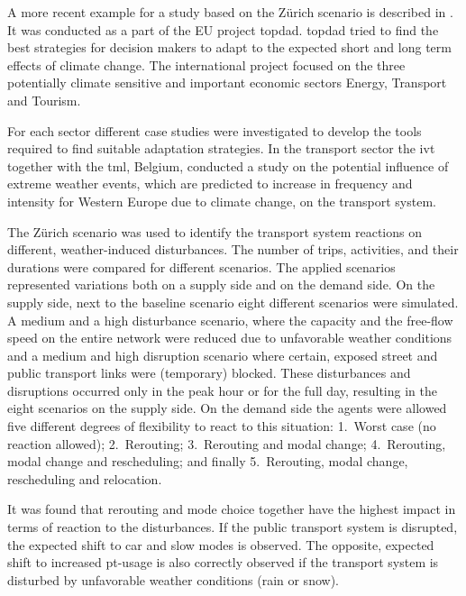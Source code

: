 A more recent example for a study based on the Zürich scenario is described in \citet[][]{HeyndrickxEtAl_unpub_TRB_2016, BoeschEtAl_TechRep_ToPDAd_2014,HeyndrickxEtAl_TechRep_IVT_2014,PilliSihvolaEtAl_EJTIR_2014,BoeschCiari_STRC_2014,Boesch_unpub_MATSim_2014}. It was conducted as a part of the EU project \gls{topdad}. \gls{topdad} tried to find the best strategies for decision makers to adapt to the expected short and long term effects of climate change. The international project focused on the three potentially climate sensitive and important economic sectors Energy, Transport and Tourism.

For each sector different case studies were investigated to develop the tools required to find suitable adaptation strategies. In the transport sector the \gls{ivt} together with the \gls{tml}, Belgium, conducted a study on the potential influence of extreme weather events, which are predicted to increase in frequency and intensity for Western Europe due to climate change, on the transport system.

The Zürich scenario was used to identify the transport system reactions on different, weather-induced disturbances. The number of trips, activities, and their durations were compared for different scenarios. The applied scenarios represented variations both on a supply side and on the demand side. On the supply side, next to the baseline scenario eight different scenarios were simulated. A medium and a high disturbance scenario, where the capacity and the free-flow speed on the entire network were reduced due to unfavorable weather conditions and a medium and high disruption scenario where certain, exposed street and public transport links were (temporary) blocked. These disturbances and disruptions occurred only in the peak hour or for the full day, resulting in the eight scenarios on the supply side. On the demand side the agents were allowed five different degrees of flexibility to react to this situation: 1.~Worst case (no reaction allowed); 2.~Rerouting; 3.~Rerouting and modal change; 4.~Rerouting, modal change and rescheduling; and finally 5.~Rerouting, modal change, rescheduling and relocation.

It was found that rerouting and mode choice together have the highest impact in terms of reaction to the disturbances. If the public transport system is disrupted, the expected shift to car and slow modes is observed. The opposite, expected shift to increased pt-usage is also correctly observed if the transport system is disturbed by unfavorable weather conditions (\eg rain or snow).

